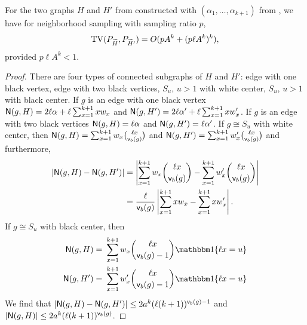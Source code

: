 \begin{lemma} \label{lmm:tv-edge-forest}
For the two graphs $ H $ and $ H' $ from  constructed with $(\alpha_1, \dots, \alpha_{k+1})$ from , we have for neighborhood sampling with sampling ratio $ p $,
\begin{equation*}
{\rm TV}(P_{{\widetilde{H}}}, P_{{\widetilde{H}}'}) = O(pA^k + (p\ell A^k)^{k}),
\end{equation*}
provided $ p\ell A^k < 1 $.
\end{lemma}

\begin{proof}
There are four types of connected subgraphs of $ H $ and $ H' $: edge with one black vertex, edge with two black vertices, $ S_u $, $u > 1$ with white center, $ S_u $, $u > 1$ with black center. If $ g $ is an edge with one black vertex $ {\mathsf{N}}(g, H) = 2\ell\alpha + \ell\sum_{x=1}^{k+1} xw_x $ and $ {\mathsf{N}}(g, H') = 2\ell\alpha' + \ell\sum_{x=1}^{k+1} xw'_x $. If $ g $ is an edge with two black vertices $ {\mathsf{N}}(g, H) = \ell\alpha $ and $ {\mathsf{N}}(g, H') = \ell\alpha' $. If $ g \cong S_u $ with white center, then $ {\mathsf{N}}(g, H) = \sum_{x=1}^{k+1}w_x\binom{\ell x}{{\mathsf{v}}_b(g)} $ and $ {\mathsf{N}}(g, H') = \sum_{x=1}^{k+1} w'_x\binom{\ell x}{{\mathsf{v}}_b(g)} $ and furthermore,
\begin{align*}
|{\mathsf{N}}(g, H)-{\mathsf{N}}(g, H')| & =
\left|\sum_{x=1}^{k+1}w_x \binom{\ell x}{{\mathsf{v}}_b(g)} - \sum_{x=1}^{k+1}w'_x \binom{\ell x}{{\mathsf{v}}_b(g)}\right| \\
& = \frac{\ell}{{\mathsf{v}}_b(g)}\left|\sum_{x=1}^{k+1}xw_x - \sum_{x=1}^{k+1}xw'_x\right|.
\end{align*}
If $ g \cong S_u $ with black center, then 
\begin{align*}
\N(g, H)= & ~   \sum_{x=1}^{k+1}w_x\binom{\ell x}{\sfv_b(g)-1}\Indc\{ \ell x = u \}\\
\N(g, H') = & ~ 	\sum_{x=1}^{k+1} w'_x\binom{\ell x}{\sfv_b(g)-1}\Indc\{ \ell x = u \} 
\end{align*}
We find that $ |{\mathsf{N}}(g, H)-{\mathsf{N}}(g, H')| \leq 2a^k(\ell(k+1))^{{\mathsf{v}}_b(g)-1} $ and $ |{\mathsf{N}}(g, H)| \leq 2a^k(\ell(k+1))^{{\mathsf{v}}_b(g)} $. 


\end{proof}
